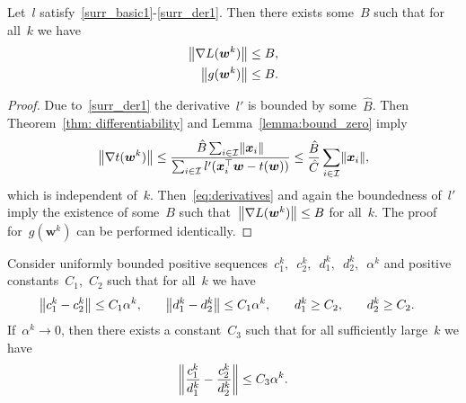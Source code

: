 \begin{lemma}\label{lemma:bound_g}
  Let~$l$ satisfy~\ref{surr_basic1}-\ref{surr_der1}. Then there exists some~$B$ such that for all~$k$ we have
  \begin{equation*}
    \begin{aligned}
      \norm{\nabla L(\bm{w}^k)} & \leq B, \\
      \norm{g(\bm{w}^k)} & \leq B.
    \end{aligned}
  \end{equation*}
\end{lemma}
\begin{proof}
  Due to~\ref{surr_der1} the derivative~$l'$ is bounded by some~$\hat{B}$. Then Theorem~\ref{thm: differentiability} and Lemma~\ref{lemma:bound_zero} imply
  \begin{equation*}
    \norm{\nabla t(\bm{w}^k)}
      \leq \frac{\hat{B} \sum_{i \in \I} \norm{\bm{x}_i}}{\sum_{i \in \I} l'(\bm{x}_i^\top \bm{w} - t(\bm{w}))}
      \leq \frac{\hat{B}}{\hat{C}} \sum_{i\in \I} \norm{\bm{x}_i},
  \end{equation*}
  which is independent of~$k$. Then~\eqref{eq:derivatives} and again the boundedness of~$l'$ imply the existence of some~$B$ such that~$\norm{\nabla L(\bm{w}^k)} \leq B$ for all~$k$. The proof for~$g(\bm{w}^k)$ can be performed identically.
\end{proof}

\begin{lemma}\label{lemma:ratio}
  Consider uniformly bounded positive sequences~$c_1^k,$~$c_2^k,$~$d_1^k,$~$d_2^k,$~$\alpha^k$ and positive constants~$C_1$,~$C_2$ such that for all~$k$ we have
  \begin{equation*}
    \begin{aligned}
      \norm{c_1^k-c_2^k} & \leq C_1\alpha^k, \quad &
      \norm{d_1^k-d_2^k} & \leq C_1\alpha^k, \quad &
      d_1^k & \geq C_2, \quad &
      d_2^k & \geq C_2.
    \end{aligned}
  \end{equation*}
  If~$\alpha^k \to 0$, then there exists a constant~$C_3$ such that for all sufficiently large~$k$ we have
  \begin{equation*}
    \norm{\frac{c_1^k}{d_1^k} - \frac{c_2^k}{d_2^k}} \leq C_3\alpha^k.
  \end{equation*}
\end{lemma}

